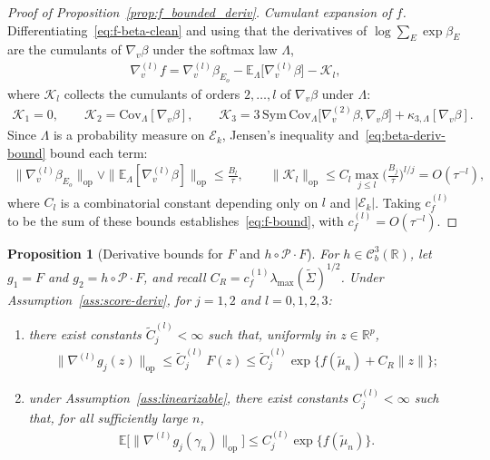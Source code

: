\documentclass[12pt]{article}
\newcommand{\op}{\mathrm{op}}
\newtheorem{proposition}{Proposition}[section]
\newcommand{\real}{\mathbb{R}}
\newcommand{\Ee}{{\mathbb{E}}}
\newcommand{\cP}{{\mathcal{P}}}
\newcommand{\cK}{{\mathcal{K}}}
\newcommand{\Ek}{\mathcal{E}_{k}}      %
\begin{document}
\begin{appendices}
\begin{proof}[Proof of Proposition~\ref{prop:f_bounded_deriv}]
\medskip\noindent\emph{Cumulant expansion of $f$.}
Differentiating~\eqref{eq:f-beta-clean} and using that the derivatives of
$\log\sum_E\exp\beta_E$ are the cumulants of $\nabla_v\beta$ under the
softmax law $\Lambda$,
\begin{align}
  \label{eq:f-cumulant-clean}
  \nabla_v^{(l)}f
  =\nabla_v^{(l)}\beta_{E_o}
   -\Ee_\Lambda\!\big[\nabla_v^{(l)}\beta\big]
   -\cK_l,
\end{align}
where $\cK_l$ collects the cumulants of orders $2,\dots,l$ of
$\nabla_v\beta$ under $\Lambda$:
\begin{align*}
  \cK_1=0,
  \qquad
  \cK_2=\mathrm{Cov}_\Lambda[\nabla_v\beta],
  \qquad
  \cK_3=3\,\mathrm{Sym}\,\mathrm{Cov}_\Lambda
        \big[\nabla_v^{(2)}\beta,\nabla_v\beta\big]
        +\kappa_{3,\Lambda}[\nabla_v\beta].
\end{align*}
Since $\Lambda$ is a probability measure on $\Ek$, Jensen's inequality
and~\eqref{eq:beta-deriv-bound} bound each term:
\begin{align*}
  \|\nabla_v^{(l)}\beta_{E_o}\|_{\op}
  \vee\|\Ee_\Lambda[\nabla_v^{(l)}\beta]\|_{\op}
  \le\frac{B_l}{\tau},
  \qquad
  \|\cK_l\|_{\op}
  \le C_l\max_{j\le l}\Big(\frac{B_j}{\tau}\Big)^{\!l/j}
  =O(\tau^{-l}),
\end{align*}
where $C_l$ is a combinatorial constant depending only on $l$ and
$|\Ek|$. Taking $c_f^{(l)}$ to be the sum of these bounds
establishes~\eqref{eq:f-bound}, with $c_f^{(l)}=O(\tau^{-l})$.
\end{proof}

\begin{proposition}[Derivative bounds for $F$ and $h\circ\cP\cdot F$]
\label{prop:deriv-bounds}
For $h\in\mathcal C^3_b(\real)$, let $g_1=F$ and $g_2=h\circ\cP\cdot F$,
and recall $C_R=c_f^{(1)}\lambda_{\max}(\widetilde\Sigma)^{1/2}$. Under
Assumption~\ref{ass:score-deriv}, for $j=1,2$ and $l=0,1,2,3$:
\begin{enumerate}
\item[(i)] there exist constants $\widetilde C^{(l)}_j<\infty$ such that,
uniformly in $z\in\real^p$,
\begin{align}
  \label{eq:deriv-F}
  \|\nabla^{(l)}g_j(z)\|_{\op}
  \le\widetilde C^{(l)}_j\,F(z)
  \le\widetilde C^{(l)}_j
     \exp\!\big\{f(\widetilde\mu_n)+C_R\|z\|\big\};
\end{align}
\item[(ii)] under Assumption~\ref{ass:linearizable}, there exist
constants $C^{(l)}_j<\infty$ such that, for all sufficiently large $n$,
\begin{align}
  \label{eq:deriv-gamma}
  \Ee\big[\|\nabla^{(l)}g_j(\gamma_n)\|_{\op}\big]
  \le C^{(l)}_j\exp\{f(\widetilde\mu_n)\}.
\end{align}
\end{enumerate}
\end{proposition}


\end{appendices}
\end{document}
